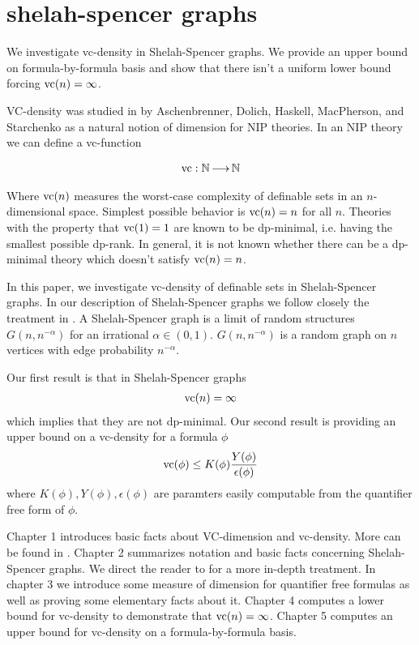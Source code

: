 \chapter{shelah-spencer graphs}

  We investigate vc-density in Shelah-Spencer graphs.
  We provide an upper bound on formula-by-formula basis and show that there isn't a uniform lower bound forcing $\operatorname{vc}(n) = \infty$.

VC-density was studied in \cite{density} by Aschenbrenner, Dolich, Haskell, MacPherson, and Starchenko as a natural notion of dimension for NIP theories. In an NIP theory we can define a vc-function

\begin{align*}
	\operatorname{vc} : \mathbb{N} \operatorname{\longrightarrow} \mathbb{N}
\end{align*}

Where $\operatorname{vc}(n)$ measures the worst-case complexity of definable sets in an $n$-dimensional space. Simplest possible behavior is $\operatorname{vc}(n) = n$ for all $n$. Theories with the property that $\operatorname{vc}(1) = 1$ are known to be dp-minimal, i.e. having the smallest possible dp-rank. In general, it is not known whether there can be a dp-minimal theory which doesn't satisfy $\operatorname{vc}(n)=n$.

In this paper, we investigate vc-density of definable sets in Shelah-Spencer graphs.
In our description of Shelah-Spencer graphs we follow closely the treatment in \cite{laskowski}.
A Shelah-Spencer graph is a limit of random structures $G(n, n^{-\alpha})$ for an irrational $\alpha \in (0,1)$.
$G(n, n^{-\alpha})$ is a random graph on $n$ vertices with edge probability $n^{-\alpha}$.

Our first result is that in Shelah-Spencer graphs
\begin{align*}
    \operatorname{vc}(n) = \infty
\end{align*}
which implies that they are not dp-minimal.
Our second result is providing an upper bound on a vc-density for a formula $\phi$
\begin{align*}
    \operatorname{vc}(\phi) \leq K(\phi) \frac{Y(\phi)}{\epsilon(\phi)}    
\end{align*}
where $K(\phi), Y(\phi), \epsilon(\phi)$ are paramters easily computable from the quantifier free form of $\phi$.

Chapter 1 introduces basic facts about VC-dimension and vc-density.
More can be found in \cite{density}.
Chapter 2 summarizes notation and basic facts concerning Shelah-Spencer graphs.
We direct the reader to \cite{laskowski} for a more in-depth treatment.
In chapter 3 we introduce some measure of dimension for quantifier free formulas as well as proving some elementary facts about it.
Chapter 4 computes a lower bound for vc-density to demonstrate that $\operatorname{vc}(n) = \infty$.
Chapter 5 computes an upper bound for vc-density on a formula-by-formula basis.

